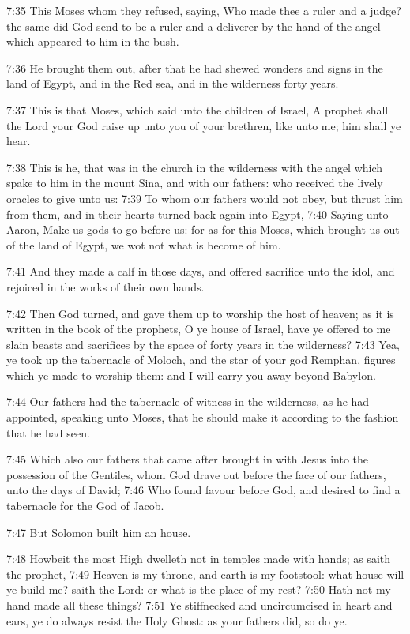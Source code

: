 7:35 This Moses whom they refused, saying, Who made thee a ruler and a
judge? the same did God send to be a ruler and a deliverer by the hand
of the angel which appeared to him in the bush.

7:36 He brought them out, after that he had shewed wonders and signs
in the land of Egypt, and in the Red sea, and in the wilderness forty
years.

7:37 This is that Moses, which said unto the children of Israel, A
prophet shall the Lord your God raise up unto you of your brethren,
like unto me; him shall ye hear.

7:38 This is he, that was in the church in the wilderness with the
angel which spake to him in the mount Sina, and with our fathers: who
received the lively oracles to give unto us: 7:39 To whom our fathers
would not obey, but thrust him from them, and in their hearts turned
back again into Egypt, 7:40 Saying unto Aaron, Make us gods to go
before us: for as for this Moses, which brought us out of the land of
Egypt, we wot not what is become of him.

7:41 And they made a calf in those days, and offered sacrifice unto
the idol, and rejoiced in the works of their own hands.

7:42 Then God turned, and gave them up to worship the host of heaven;
as it is written in the book of the prophets, O ye house of Israel,
have ye offered to me slain beasts and sacrifices by the space of
forty years in the wilderness?  7:43 Yea, ye took up the tabernacle of
Moloch, and the star of your god Remphan, figures which ye made to
worship them: and I will carry you away beyond Babylon.

7:44 Our fathers had the tabernacle of witness in the wilderness, as
he had appointed, speaking unto Moses, that he should make it
according to the fashion that he had seen.

7:45 Which also our fathers that came after brought in with Jesus into
the possession of the Gentiles, whom God drave out before the face of
our fathers, unto the days of David; 7:46 Who found favour before God,
and desired to find a tabernacle for the God of Jacob.

7:47 But Solomon built him an house.

7:48 Howbeit the most High dwelleth not in temples made with hands; as
saith the prophet, 7:49 Heaven is my throne, and earth is my
footstool: what house will ye build me? saith the Lord: or what is the
place of my rest?  7:50 Hath not my hand made all these things?  7:51
Ye stiffnecked and uncircumcised in heart and ears, ye do always
resist the Holy Ghost: as your fathers did, so do ye.

